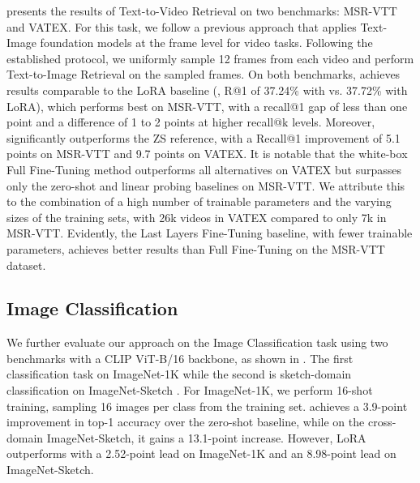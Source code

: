  presents the results of Text-to-Video Retrieval on two benchmarks: MSR-VTT and VATEX. For this task, we follow a previous approach \cite{BLIP} that applies Text-Image foundation models at the frame level for video tasks. Following the established protocol, we uniformly sample 12 frames from each video and perform Text-to-Image Retrieval on the sampled frames. On both benchmarks, \ours achieves results comparable to the LoRA baseline (\eg, R@1 of 37.24\% with \ours vs. 37.72\% with LoRA), which performs best on MSR-VTT, with a recall@1 gap of less than one point and a difference of 1 to 2 points at higher recall@k levels. Moreover, \ours significantly outperforms the ZS reference, with a Recall@1 improvement of 5.1 points on MSR-VTT and 9.7 points on VATEX. It is notable that the white-box Full Fine-Tuning method outperforms all alternatives on VATEX but surpasses only the zero-shot and linear probing baselines on MSR-VTT. We attribute this to the combination of a high number of trainable parameters and the varying sizes of the training sets, with 26k videos in VATEX compared to only 7k in MSR-VTT. Evidently, the Last Layers Fine-Tuning baseline, with fewer trainable parameters, achieves better results than Full Fine-Tuning on the MSR-VTT dataset.
\subsection{Image Classification}

We further evaluate our approach on the Image Classification task using two benchmarks with a CLIP ViT-B/16 backbone, as shown in . The first classification task on ImageNet-1K \citep{ImageNet} while the second is sketch-domain classification on ImageNet-Sketch \citep{ImageNet_Sketch}.
For ImageNet-1K, we perform 16-shot training, sampling 16 images per class from the training set. \ours achieves a 3.9-point improvement in top-1 accuracy over the zero-shot baseline, while on the cross-domain ImageNet-Sketch, it gains a 13.1-point increase. However, LoRA outperforms \ours with a 2.52-point lead on ImageNet-1K and an 8.98-point lead on ImageNet-Sketch.
